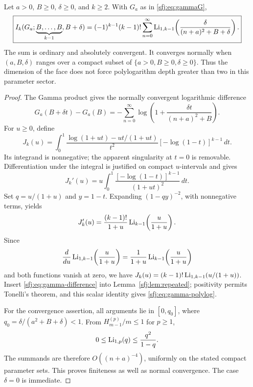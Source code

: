 \begin{theorem}
\label{sfj:thm:gamma-polylog}
Let $a>0$, $B\ge0$, $\delta\ge0$, and $k\ge2$.  With $G_a$ as in
\eqref{sfj:eq:gammaG},
\begin{equation}\label{sfj:eq:gamma-polylog}
 \boxed{\displaystyle
 I_k(G_a;\underbrace{B,\ldots,B}_{k-1},B+\delta)
  =(-1)^{k-1}(k-1)!
     \sum_{n=0}^\infty
       \operatorname{Li}_{1,k-1}\!\left(
             \frac{\delta}{(n+a)^2+B+\delta}\right).}
\end{equation}
The sum is ordinary and absolutely convergent.  It converges normally
when $(a,B,\delta)$ ranges over a compact subset of
$\{a>0,B\ge0,\delta\ge0\}$.  Thus the dimension of the face does
not force polylogarithm depth greater than two in this parameter sector.
\end{theorem}

\begin{proof}
The Gamma product gives the normally convergent logarithmic difference
\begin{equation}\label{sfj:eq:gamma-difference}
 G_a(B+\delta t)-G_a(B)
       =-\sum_{n=0}^\infty
          \log\left(1+\frac{\delta t}{(n+a)^2+B}\right).
\end{equation}
For $u\ge0$, define
\[
 J_k(u)=\int_0^1
  \frac{\log(1+ut)-ut/(1+ut)}{t^2}
                            [-\log(1-t)]^{k-1}\,dt.
\]
Its integrand is nonnegative; the apparent singularity at $t=0$ is
removable.  Differentiation under the integral is justified on compact
$u$-intervals and gives
\[
 J_k'(u)=u\int_0^1\frac{[-\log(1-t)]^{k-1}}{(1+ut)^2}\,dt.
\]
Set $q=u/(1+u)$ and $y=1-t$.  Expanding $(1-qy)^{-2}$, with
nonnegative terms, yields
\[
 J_k'(u)
  =\frac{(k-1)!}{1+u}\operatorname{Li}_{k-1}\!\left(\frac{u}{1+u}\right).
\]
Since
\[
 \frac{d}{du}\operatorname{Li}_{1,k-1}\!\left(\frac{u}{1+u}\right)
      =\frac1{1+u}\operatorname{Li}_{k-1}\!\left(\frac{u}{1+u}\right)
\]
and both functions vanish at zero, we have
$J_k(u)=(k-1)!\operatorname{Li}_{1,k-1}(u/(1+u))$.
Insert \eqref{sfj:eq:gamma-difference} into
Lemma~\ref{sfj:lem:repeated}; positivity permits Tonelli's theorem,
and this scalar identity gives \eqref{sfj:eq:gamma-polylog}.

For the convergence assertion, all arguments lie in $[0,q_0]$, where
$q_0=\delta/(a^2+B+\delta)<1$.  From
$H_{m-1}^{(p)}/m\le1$ for $p\ge1$,
\[
 0\le\operatorname{Li}_{1,p}(q)\le\frac{q^2}{1-q}.
\]
The summands are therefore $O((n+a)^{-4})$, uniformly on the stated
compact parameter sets.  This proves finiteness as well as normal
convergence.  The case $\delta=0$ is immediate.
\end{proof}

